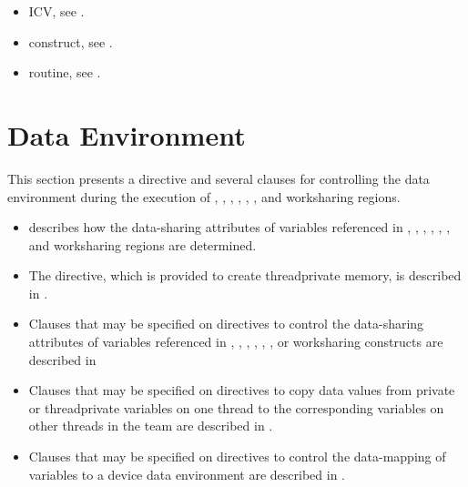 \begin{samepage}
\crossreferences
\begin{itemize}
\item {} ICV, see
.

\item {} construct, see 
.

\item {} routine, see 
.
\end{itemize}
\end{samepage}









\section{Data Environment}
\label{sec:Data Environment}
This section presents a directive and several clauses for controlling the data environment 
during the execution of , , , , , , and worksharing regions.

\begin{itemize}
\item {} 
describes how the data-sharing attributes of variables
referenced in , , , , , , and worksharing regions are determined.

\item The  directive, which is provided to create threadprivate memory, 
is described in .

\item Clauses that may be specified on directives to control the data-sharing attributes of 
variables referenced in , , , , , , or worksharing constructs are described in 

\item Clauses that may be specified on directives to copy data values from private or 
threadprivate variables on one thread to the corresponding variables on other threads 
in the team are described in .

\item Clauses that may be specified on directives to control the data-mapping of variables to a device data environment are described in .
\end{itemize}










